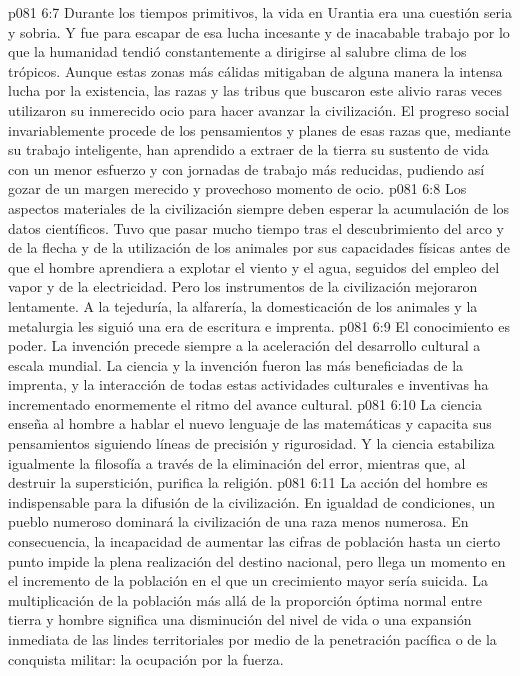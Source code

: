 \vs p081 6:7 Durante los tiempos primitivos, la vida en Urantia era una cuestión seria y sobria. Y fue para escapar de esa lucha incesante y de inacabable trabajo por lo que la humanidad tendió constantemente a dirigirse al salubre clima de los trópicos. Aunque estas zonas más cálidas mitigaban de alguna manera la intensa lucha por la existencia, las razas y las tribus que buscaron este alivio raras veces utilizaron su inmerecido ocio para hacer avanzar la civilización. El progreso social invariablemente procede de los pensamientos y planes de esas razas que, mediante su trabajo inteligente, han aprendido a extraer de la tierra su sustento de vida con un menor esfuerzo y con jornadas de trabajo más reducidas, pudiendo así gozar de un margen merecido y provechoso momento de ocio.
\vs p081 6:8  Los aspectos materiales de la civilización siempre deben esperar la acumulación de los datos científicos. Tuvo que pasar mucho tiempo tras el descubrimiento del arco y de la flecha y de la utilización de los animales por sus capacidades físicas antes de que el hombre aprendiera a explotar el viento y el agua, seguidos del empleo del vapor y de la electricidad. Pero los instrumentos de la civilización mejoraron lentamente. A la tejeduría, la alfarería, la domesticación de los animales y la metalurgia les siguió una era de escritura e imprenta.
\vs p081 6:9 El conocimiento es poder. La invención precede siempre a la aceleración del desarrollo cultural a escala mundial. La ciencia y la invención fueron las más beneficiadas de la imprenta, y la interacción de todas estas actividades culturales e inventivas ha incrementado enormemente el ritmo del avance cultural.
\vs p081 6:10 La ciencia enseña al hombre a hablar el nuevo lenguaje de las matemáticas y capacita sus pensamientos siguiendo líneas de precisión y rigurosidad. Y la ciencia estabiliza igualmente la filosofía a través de la eliminación del error, mientras que, al destruir la superstición, purifica la religión.
\vs p081 6:11  La acción del hombre es indispensable para la difusión de la civilización. En igualdad de condiciones, un pueblo numeroso dominará la civilización de una raza menos numerosa. En consecuencia, la incapacidad de aumentar las cifras de población hasta un cierto punto impide la plena realización del destino nacional, pero llega un momento en el incremento de la población en el que un crecimiento mayor sería suicida. La multiplicación de la población más allá de la proporción óptima normal entre tierra y hombre significa una disminución del nivel de vida o una expansión inmediata de las lindes territoriales por medio de la penetración pacífica o de la conquista militar: la ocupación por la fuerza.
